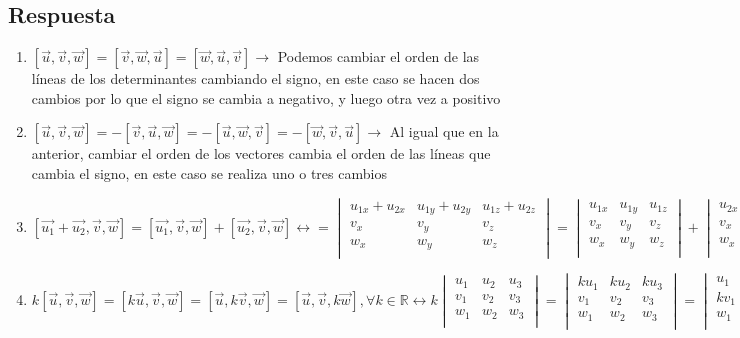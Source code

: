 \documentclass[
	12pt, %
	spanish, %
]{fphw}
\newcommand{\vu}{\vec{u}}
\newcommand{\vv}{\vec{v}}
\newcommand{\vw}{\vec{w}}
\begin{document}
\subsection*{Respuesta}
\begin{enumerate}
	\item $[\vu,\vv,\vw] = [\vv,\vw,\vu] = [\vw,\vu,\vv] \rightarrow$ Podemos cambiar el orden de las líneas de los determinantes cambiando el signo, en este caso se hacen dos cambios por lo que el signo se cambia a negativo, y luego otra vez a positivo
	\item $[\vu,\vv,\vw] = - [\vv,\vu,\vw] = - [\vu,\vw,\vv] = - [\vw,\vv,\vu] \rightarrow$ Al igual que en la anterior, cambiar el orden de los vectores cambia el orden de las líneas que cambia el signo, en este caso se realiza uno o tres cambios
	\item $[\vec{u_1} + \vec{u_2}, \vv,\vw] = [\vec{u_1},\vv,\vw] + [\vec{u_2},\vv,\vw] \leftrightarrow =
	\begin{vmatrix}
			u_{1x} + u_{2x} & u_{1y} + u_{2y} & u_{1z}+ u_{2z}\\
			v_x & v_y & v_z\\
			w_x & w_y & w_z\\	
	\end{vmatrix}
	=
	\begin{vmatrix}
			u_{1x} & u_{1y} & u_{1z}\\
			v_x & v_y & v_z\\
			w_x & w_y & w_z\\	
	\end{vmatrix}
	+
	\begin{vmatrix}
			u_{2x} & u_{2y} & u_{2z}\\
			v_x & v_y & v_z\\
			w_x & w_y & w_z\\	
	\end{vmatrix}$
	\item $k[\vu,\vv,\vw] = [k\vu,\vv,\vw] = [\vu,k\vv,\vw] = [\vu,\vv,k\vw], \forall k \in \mathbb{R} \leftrightarrow k 
	\begin{vmatrix}
	u_1 & u_2 & u_3\\
	v_1 & v_2 & v_3\\
	w_1 & w_2 & w_3\\	
	\end{vmatrix}
	= 
	\begin{vmatrix}
		ku_1 & ku_2 & ku_3\\
		v_1 & v_2 & v_3\\
		w_1 & w_2 & w_3\\	
	\end{vmatrix}
	=
	\begin{vmatrix}
			u_1 & u_2 & u_3\\
			kv_1 & kv_2 & kv_3\\
			w_1 & w_2 & w_3\\	
	\end{vmatrix}
	=
	\begin{vmatrix}
			u_1 & u_2 & u_3\\
			v_1 & v_2 & v_3\\
			kw_1 & kw_2 & kw_3\\	
	\end{vmatrix}$

\end{enumerate}
\end{document}
